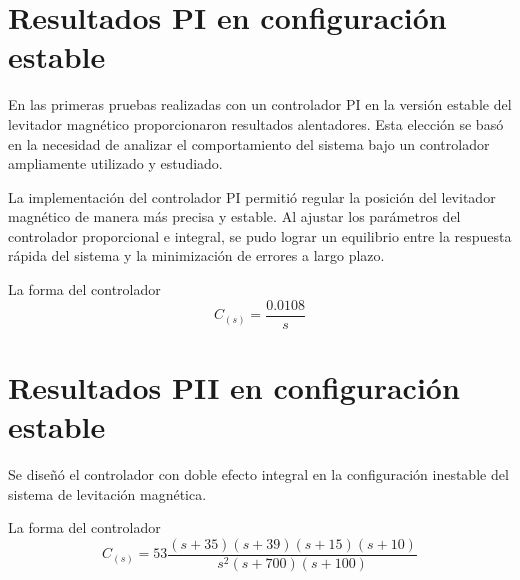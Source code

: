 \section{Resultados PI en configuración estable}

En las primeras pruebas realizadas con un controlador PI en la versión estable del levitador magnético proporcionaron resultados alentadores. Esta elección se basó en la necesidad de analizar el comportamiento del sistema bajo un controlador ampliamente utilizado y estudiado.

La implementación del controlador PI permitió regular la posición del levitador magnético de manera más precisa y estable. Al ajustar los parámetros del controlador proporcional e integral, se pudo lograr un equilibrio entre la respuesta rápida del sistema y la minimización de errores a largo plazo.

La forma del controlador 
\[
C_{(s)} = \frac{0.0108}{s}
\]


\section{Resultados PII en configuración estable}

Se diseñó el controlador con doble efecto integral en la configuración inestable del sistema de levitación magnética. 

La forma del controlador 
\[
C_{(s)} = 53\frac{(s+35)(s+39)(s+15)(s+10)}{s^2(s+700)(s+100)}
\]










    
    
